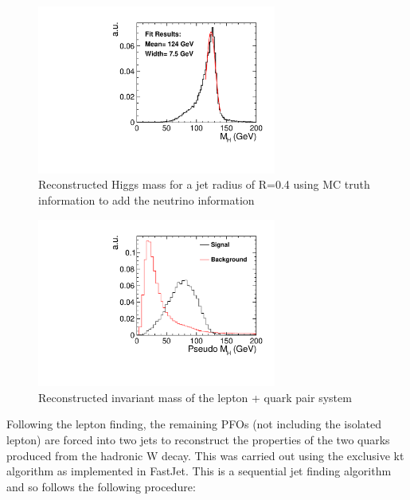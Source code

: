 \begin{figure}
  \centering
  \includegraphics[width=0.7\textwidth,keepaspectratio]{HiggsAnalysis/figures/CheatHiggs04}
  \caption[Reconstructed Higgs Mass For Optimum Jet Radius]{Reconstructed Higgs mass for a jet radius of R=0.4 using MC truth information to add the neutrino information}
  \label{fig:cheatHiggsMass}
\end{figure}

\begin{figure}
  \centering
  \includegraphics[width=0.7\textwidth,keepaspectratio]{HiggsAnalysis/figures/PseudoHiggs.pdf}
  \caption[Reconstructed Higgs Mass]{Reconstructed invariant mass of the lepton + quark pair system}
  \label{fig:pseudoHiggsMass}
\end{figure}


Following the lepton finding, the remaining PFOs (not including the isolated lepton) are forced into two jets to reconstruct the properties of the two quarks produced from the hadronic W decay. This was carried out using the exclusive kt algorithm as implemented in FastJet. This is a sequential jet finding algorithm and so follows the following procedure:

